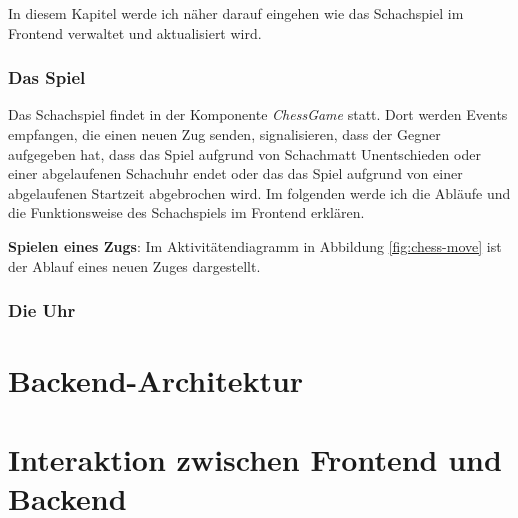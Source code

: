 \documentclass[a4paper,12pt]{report}
\begin{document}
In diesem Kapitel werde ich näher darauf eingehen wie das Schachspiel im Frontend verwaltet und aktualisiert wird. 
        \subsubsection{Das Spiel}
Das Schachspiel findet in der Komponente \textit{ChessGame} statt. Dort werden Events empfangen, die einen neuen Zug senden, signalisieren, dass der Gegner aufgegeben hat, dass das Spiel aufgrund von Schachmatt Unentschieden oder einer abgelaufenen Schachuhr endet oder das das Spiel aufgrund von einer abgelaufenen Startzeit abgebrochen wird. Im folgenden werde ich die Abläufe und die Funktionsweise des Schachspiels im Frontend erklären.

\textbf{Spielen eines Zugs}: Im Aktivitätendiagramm in Abbildung \ref{fig:chess-move} ist der Ablauf eines neuen Zuges dargestellt.
        \subsubsection{Die Uhr}
    
        \section{Backend-Architektur}
        \section{Interaktion zwischen Frontend und Backend}
        
       
\end{document}
